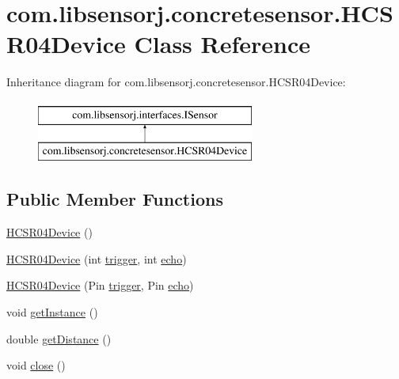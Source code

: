 \hypertarget{classcom_1_1libsensorj_1_1concretesensor_1_1HCSR04Device}{}\section{com.\+libsensorj.\+concretesensor.\+H\+C\+S\+R04\+Device Class Reference}
\label{classcom_1_1libsensorj_1_1concretesensor_1_1HCSR04Device}
Inheritance diagram for com.\+libsensorj.\+concretesensor.\+H\+C\+S\+R04\+Device\+:\begin{figure}[H]
\begin{center}
\leavevmode
\includegraphics[height=2.000000cm]{classcom_1_1libsensorj_1_1concretesensor_1_1HCSR04Device}
\end{center}
\end{figure}
\subsection*{Public Member Functions}
\begin{DoxyCompactItemize}
\item 
\hyperlink{classcom_1_1libsensorj_1_1concretesensor_1_1HCSR04Device_ae0c7cdd02e374f360dff8d06a59b7c6d}{H\+C\+S\+R04\+Device} ()
\item 
\hyperlink{classcom_1_1libsensorj_1_1concretesensor_1_1HCSR04Device_af8ae9ca0143411e335265cadc2408750}{H\+C\+S\+R04\+Device} (int \hyperlink{classcom_1_1libsensorj_1_1concretesensor_1_1HCSR04Device_ac898198f98143f7a1a4f281ea3c7c607}{trigger}, int \hyperlink{classcom_1_1libsensorj_1_1concretesensor_1_1HCSR04Device_adf8ec00f094aefba690583e5a349c99d}{echo})
\item 
\hyperlink{classcom_1_1libsensorj_1_1concretesensor_1_1HCSR04Device_a670b627ac1e084439794d01df01f4121}{H\+C\+S\+R04\+Device} (Pin \hyperlink{classcom_1_1libsensorj_1_1concretesensor_1_1HCSR04Device_ac898198f98143f7a1a4f281ea3c7c607}{trigger}, Pin \hyperlink{classcom_1_1libsensorj_1_1concretesensor_1_1HCSR04Device_adf8ec00f094aefba690583e5a349c99d}{echo})
\item 
void \hyperlink{classcom_1_1libsensorj_1_1concretesensor_1_1HCSR04Device_a3395de7d81b875516fb5c539accb27d1}{get\+Instance} ()
\item 
double \hyperlink{classcom_1_1libsensorj_1_1concretesensor_1_1HCSR04Device_aa30e4f6775819a36bc231a226c397bef}{get\+Distance} ()
\item 
void \hyperlink{classcom_1_1libsensorj_1_1concretesensor_1_1HCSR04Device_a69a3472b508507649ccb57e6fef81d6c}{close} ()
\end{DoxyCompactItemize}
